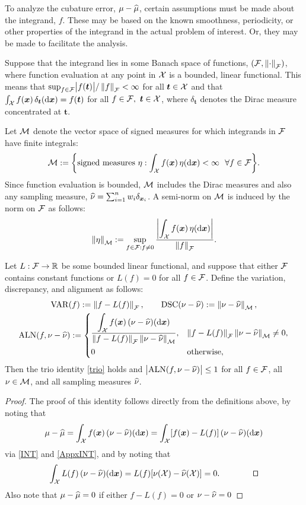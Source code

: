 \documentclass[graybox]{svmult}
\newcommand{\R}{\mathbb{R}} %
\newcommand{\bst}{\boldsymbol{t}}    %
\newcommand{\bsx}{\boldsymbol{x}}    %
\DeclareMathOperator{\algn}{ALN}
\DeclareMathOperator{\disc}{DSC}
\DeclareMathOperator{\Var}{VAR}
\begin{document}
To analyze the cubature error, $\mu - \widehat{\mu}$, certain assumptions must be made about the integrand, $f$.  These may be based on the known smoothness, periodicity, or other properties of the integrand in the actual problem of interest.  Or, they may be made to facilitate the analysis.

Suppose that the integrand lies in some Banach space of functions, $(\mathcal{F},\left \lVert \cdot \right \rVert_{\mathcal{F}})$, where function evaluation at any point  in $\mathcal{X}$ is a bounded, linear functional.  This means that $\sup_{f \in \cf} \abs{f(\bst)}/\norm{f}_{\cf} < \infty$ for all $\bst \in \cx$ and that $\int_{\cx} f(\bsx) \, \delta_{\bst}(\D\bsx) =f(\bst)$ for all $f \in \cf, \ \bst \in \cx$, where $\delta_{\bst}$ denotes the Dirac measure concentrated at $\bst$.  

Let $\mathcal{M}$ denote the vector space of signed measures for which integrands in $\mathcal{F}$ have finite integrals:
\begin{equation}
\cm : = \biggl \{\text{signed measures } \eta : \int_{\cx} f(\bsx) \, \eta(\D\bsx) < \infty \ \ \forall f \in \cf \biggr \}.
\end{equation}
Since function evaluation is bounded, $\mathcal{M}$ includes the Dirac measures and also any sampling measure, $\hnu = \sum_{i=1}^n w_i \delta_{\bsx_i}$.  A semi-norm on $\mathcal{M}$ is induced by the norm on $\mathcal{F}$ as follows:
\begin{equation}
\snorm{\eta}_{\cm}  : =\sup_{f \in \cf : f \ne 0} \frac{\displaystyle \biggabs{\int_{\cx} f(\bsx) \, \eta(\D \bsx)}}{\norm{f}_{\cf}}.
\end{equation}

\begin{theorem}  Let $L :\cf \to \R$ be some bounded linear functional, and suppose that either $\mathcal{F}$ contains constant functions or $L(f)=0$ for all $f \in \mathcal{F}$.
Define the variation, discrepancy, and alignment as follows:
\begin{gather*}
\Var(f) := \norm{f- L(f)}_{\cf}, \qquad \disc(\nu - \hnu) : = \norm{\nu - \hnu}_{\cm}, \\
\algn(f,\nu - \hnu): =  \begin{cases} \displaystyle 
\frac{\displaystyle\int_{\cx} f(\bsx) \, (\nu - \hnu)(\D \bsx)}{\snorm{f-L(f)}_{\cf}\snorm{\nu - \hnu}_{\cm}},  & \snorm{f-L(f)}_{\cf}\snorm{\nu - \hnu}_{\cm} \ne 0, \\[2ex]
0 & \text{otherwise},
\end{cases}
\end{gather*}
Then the trio identity \cref{trio} holds and $\abs{\algn(f,\nu - \hnu)} \le 1$ for all $f \in \mathcal{F}$, all $\nu \in \mathcal{M}$, and all sampling measures $\widehat{\nu}$. 
\end{theorem}
\begin{proof}  The proof of this identity follows directly from the definitions above, by noting that 
\[
\mu - \hmu  =  \int_{\cx} f(\bsx) \, (\nu - \hnu)(\D \bsx) = \int_{\cx} [f(\bsx) - L(f)] \, (\nu - \hnu)(\D \bsx)
\]
via \eqref{INT} and \cref{AppxINT}, and by noting that 
\[
 \int_{\cx} L(f)\, (\nu - \hnu)(\D \bsx) =  L(f) [\nu(\cx) - \hnu(\cx)] = 0. \qquad \qquad \qed
\]
Also note that $\mu - \widehat{\mu} = 0$ if either $f - L(f) = 0$ or $\nu - \widehat{\nu} = 0$
\end{proof}
\end{document}
